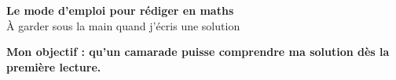 \documentclass[10pt,a4paper]{article}
\begin{document}
\begin{center}
  {\sffamily\LARGE\bfseries\color{TitreC}
  Le mode d'emploi pour rédiger en maths}\\[-0.05em]
  {\sffamily\small\color{SavoirC}
  À garder sous la main quand j'écris une solution}
\end{center}

\vspace{0.15em}

\begin{tcolorbox}[
  enhanced,
  colback=SavoirBg,
  colframe=SavoirC!65,
  boxrule=0.7pt,
  arc=2mm,
  left=3mm,right=3mm,top=1.5mm,bottom=1.5mm,
  before skip=1mm,after skip=2mm
]
\centering
{\sffamily\bfseries\color{SavoirC}
Mon objectif : qu'un camarade puisse comprendre ma solution dès la première lecture.}
\end{tcolorbox}

\vspace{0.2em}

\end{document}
